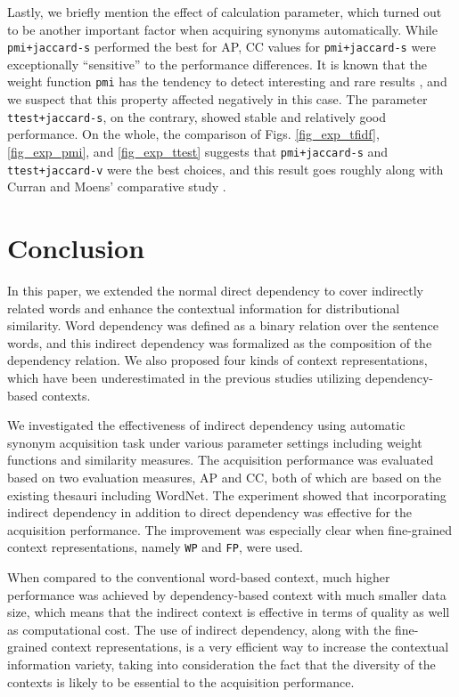 \documentclass[english]{jnlp_1.4}
\begin{document}
Lastly, we briefly mention the effect of calculation parameter, which
turned out to be another important factor when acquiring synonyms
automatically. While \verb|pmi+jaccard-s| performed the best for AP,
CC values for \verb|pmi+jaccard-s| were exceptionally ``sensitive'' to
the performance differences. It is known that the weight function
\verb|pmi| has the tendency to detect interesting and rare results
\cite{Curran:02:improvements}, and we suspect that this property
affected negatively in this case. The parameter
\verb|ttest+jaccard-s|, on the contrary, showed stable and relatively
good performance. On the whole, the comparison of
Figs. \ref{fig_exp_tfidf}, \ref{fig_exp_pmi}, and
\ref{fig_exp_ttest} suggests that \verb|pmi+jaccard-s| and
\verb|ttest+jaccard-v| were the best choices, and this result goes
roughly along with Curran and Moens' comparative study
\cite{Curran:02:improvements}.

\section{Conclusion}


In this paper, we extended the normal direct dependency to cover
indirectly related words and enhance the contextual information for
distributional similarity. Word dependency was defined as a binary
relation over the sentence words, and this indirect dependency was
formalized as the composition of the dependency relation. We also
proposed four kinds of context representations, which have been
underestimated in the previous studies utilizing dependency-based
contexts.

We investigated the effectiveness of indirect dependency using
automatic synonym acquisition task under various parameter settings
including weight functions and similarity measures. The acquisition
performance was evaluated based on two evaluation measures, AP and CC,
both of which are based on the existing thesauri including WordNet.
The experiment showed that incorporating indirect dependency in
addition to direct dependency was effective for the acquisition
performance. The improvement was especially clear when fine-grained
context representations, namely \verb|WP| and \verb|FP|, were used.

When compared to the conventional word-based context, much higher
performance was achieved by dependency-based context with much smaller
data size, which means that the indirect context is effective in terms
of quality as well as computational cost. The use of indirect
dependency, along with the fine-grained context representations, is a
very efficient way to increase the contextual information variety,
taking into consideration the fact that the diversity of the contexts
is likely to be essential to the acquisition performance.
\end{document}
